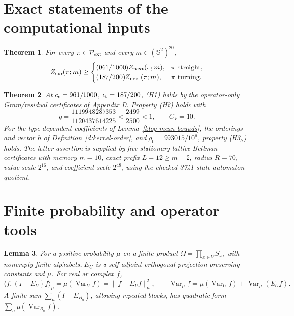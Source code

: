\documentclass[11pt,reqno]{amsart}
\newtheorem{theorem}{Theorem}[section]
\newtheorem{lemma}[theorem]{Lemma}
\theoremstyle{definition}
\theoremstyle{remark}
\begin{document}
\section{Exact statements of the computational inputs}

\begin{theorem}\label{t:H1}
For every \(\pi\in\mathcal P_{\rm ext}\) and every
\(m\in(\mathbb S^2)^{20}\),
\[
 Z_{\rm cur}(\pi;m)\ge
 \begin{cases}
 (961/1000)Z_{\rm next}(\pi;m),&\pi\text{ straight},\\
 (187/200)Z_{\rm next}(\pi;m),&\pi\text{ turning}.
 \end{cases}
\]
\end{theorem}

\begin{theorem}\label{t:inputs}
At \(c_{\rm s}=961/1000\), \(c_{\rm t}=187/200\), (H1) holds
by the operator-only Gram/residual certificates of Appendix D.
Property (H2) holds with
\[
 q=\frac{1119948287353}{1120437614225}<\frac{2499}{2500}<1,
 \qquad C_V=10 .
\]
For the type-dependent coefficients of Lemma~\ref{l:log-mean-bounds},
the orderings and vector \(h\) of Definition~\ref{d:kernel-order},
and \(\rho_0=993015/10^6\), property (H3\(_h\)) holds.
The latter assertion is supplied by five stationary lattice Bellman
certificates with memory \(m=10\), exact prefix \(L=12\ge m+2\),
radius \(R=70\), value scale \(2^{16}\), and coefficient scale
\(2^{48}\), using the checked 3741-state automaton quotient.
\end{theorem}


\section{Finite probability and operator tools}

\begin{lemma}\label{l:CE}
For a positive probability \(\mu\) on a finite product
\(\Omega=\prod_{x\in V}S_x\), with nonempty finite alphabets,
\(E_U\) is a self-adjoint orthogonal projection preserving constants
and \(\mu\). For real or complex \(f\),
\[
 \langle f,(I-E_U)f\rangle_\mu
   =\mu(\operatorname{Var}_U f)=\|f-E_Uf\|_\mu^2,\qquad
 \operatorname{Var}_\mu f=\mu(\operatorname{Var}_U f)
                          +\operatorname{Var}_\mu(E_Uf).
\]
A finite sum \(\sum_a(I-E_{B_a})\), allowing repeated blocks,
has quadratic form \(\sum_a\mu(\operatorname{Var}_{B_a}f)\).
\end{lemma}
\end{document}
